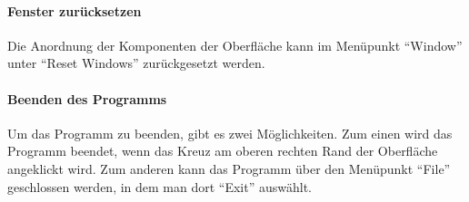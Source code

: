 \paragraph{Fenster zurücksetzen}
Die Anordnung der Komponenten der Oberfläche kann im Menüpunkt ``Window'' unter ``Reset Windows'' zurückgesetzt werden.

\paragraph{Beenden des Programms}
Um das Programm zu beenden, gibt es zwei Möglichkeiten. Zum einen wird das Programm beendet, wenn das Kreuz am oberen rechten Rand der Oberfläche angeklickt wird. Zum anderen kann das Programm über den Menüpunkt ``File'' geschlossen werden, in dem man dort ``Exit'' auswählt.